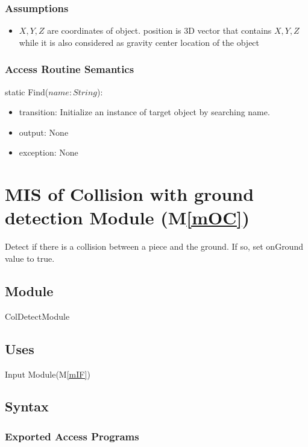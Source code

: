 \documentclass[12pt, titlepage]{article}
\newcommand{\mref}[1]{M\ref{#1}}
\begin{document}
\subsubsection{Assumptions}

\noindent
\begin{itemize}
	\item $X,Y,Z$ are coordinates of object. position is 3D vector that contains $X,Y,Z$ while it is also considered as gravity center location of the object
\end{itemize}

\subsubsection{Access Routine Semantics}

\noindent static Find($name: String$):
\begin{itemize}
	\item transition: Initialize an instance of target object by searching name.
	\item output: None
	\item exception: None
\end{itemize}


\section{MIS of Collision with ground detection Module (\mref{mOC})}

Detect if there is a collision between a piece and the ground. If so, set onGround
value to true.

\subsection{Module}

ColDetectModule

\subsection{Uses}

Input Module(\mref{mIF})

\subsection{Syntax}

\subsubsection{Exported Access Programs}
\end{document}
